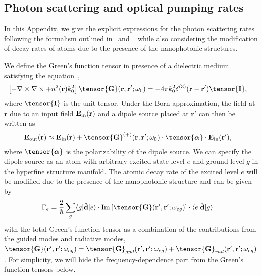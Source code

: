 \documentclass[preprint,aps,pra,onecolumn,superscriptaddress]{revtex4-1} %
\def\br{\mathbf{r}}
\def\bra#1{\langle{#1}\rvert}%
\def\ket#1{\lvert{#1}\rangle}%
\newcommand{\mbf}[1]{\mathbf{#1}}
\newcommand{\inp}{{\rm in}}
\newcommand{\out}{{\rm out}}
\newcommand{\unittens}{\tensor{\mathbf{I}}}
\begin{document}
\begin{appendix}
\section{Photon scattering and optical pumping rates} \label{Appendix::Rates}

In this Appendix, we give the explicit expressions for the photon scattering rates following the formalism outlined in~\cite{Deutsch2010a} and ~\cite{Qi2016} while also considering the modification of decay rates of atoms due to the presence of the nanophotonic structures. 

We define the Green's function tensor in presence of a dielectric medium satisfying the equation~\cite{Qi2016},
	\begin{align} \label{Eq::GreensDiffEq}
		\left[ -\nabla\times\nabla\times + n^2(\mbf{r}) k_0^2 \right] \tensor{\mathbf{G}}(\br, \br';\omega_0) &= -4\pi 
k_0^2 \delta^{(3)}(\mathbf{r}-\mathbf{r}') \unittens,
	\end{align}
where $\unittens$ is the unit tensor.
Under the Born approximation, the field at $\br$ due to an input field $ \mathbf{E}_{\inp}(\br) $ and a dipole source placed at $\br'$ can then be written as
\begin{align}
		\mathbf{E}_{\out}(\br) 
		&\approx \mathbf{E}_{\inp}(\br)+ \tensor{\mathbf{G}}^{(+)}(\br , \br'; \omega_0) \cdot 
\tensor{\boldsymbol{\alpha}}\cdot \mathbf{E}_{\inp}(\br'), \label{Eq::ScatteredField}
\end{align}
where $ \tensor{\boldsymbol{\alpha}} $ is the polarizability of the dipole source.
We can specify the dipole source as an atom with arbitrary excited state level $ e $ and ground level $ g $ in the hyperfine structure manifold. 
The atomic decay rate of the excited level $ e $ will be modified due to the presence of the nanophotonic structure and can be given by
\begin{align}
\Gamma_e &= \frac{2}{\hbar}\sum_g \bra{g}\hat{\mathbf{d}}\ket{e} \cdot \mathrm{Im}\left[\tensor{\mathbf{G}}(\br',\br';\omega_{eg}) \right]\cdot \bra{e}\hat{\mathbf{d}}\ket{g}\label{eq:Gamma_e}
\end{align}
with the total Green's function tensor as a combination of the contributions from the guided modes and radiative modes, $ \tensor{\mathbf{G}}(\br',\br';\omega_{eg})=\tensor{\mathbf{G}}_{gyd}(\br',\br';\omega_{eg})+\tensor{\mathbf{G}}_{rad}(\br',\br';\omega_{eg}) $.
For simplicity, we will hide the frequency-dependence part from the Green's function tensors below.

\end{appendix}
\end{document}
